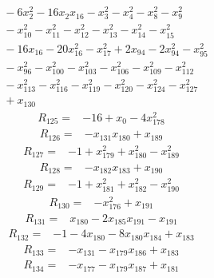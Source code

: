 {\begin{align*}
&{}  - 6x_{2}^{2} - 16x_{2} x_{16} - x_{3}^{2} - x_{4}^{2} - x_{8}^{2} - x_{9}^{2} \\
&{}  - x_{10}^{2} - x_{11}^{2} - x_{12}^{2} - x_{13}^{2} - x_{14}^{2} - x_{15}^{2} \\
&{}  - 16x_{16} - 20x_{16}^{2} - x_{17}^{2} + 2x_{94} - 2x_{94}^{2} - x_{95}^{2} \\
&{}  - x_{96}^{2} - x_{100}^{2} - x_{103}^{2} - x_{106}^{2} - x_{109}^{2} - x_{112}^{2} \\
&{}  - x_{113}^{2} - x_{116}^{2} - x_{119}^{2} - x_{120}^{2} - x_{124}^{2} - x_{127}^{2} \\
&{}  + x_{130}
\end{align*}
\begin{align*}
R_{125} ={}& -16 + x_{0} - 4x_{178}^{2}
\end{align*}
\begin{align*}
R_{126} ={}& -x_{131} x_{180} + x_{189}
\end{align*}
\begin{align*}
R_{127} ={}& -1 + x_{179}^{2} + x_{180}^{2} - x_{189}^{2}
\end{align*}
\begin{align*}
R_{128} ={}& -x_{182} x_{183} + x_{190}
\end{align*}
\begin{align*}
R_{129} ={}& -1 + x_{181}^{2} + x_{182}^{2} - x_{190}^{2}
\end{align*}
\begin{align*}
R_{130} ={}& -x_{176}^{2} + x_{191}
\end{align*}
\begin{align*}
R_{131} ={}& x_{180} - 2x_{185} x_{191} - x_{191}
\end{align*}
\begin{align*}
R_{132} ={}& -1 - 4x_{180} - 8x_{180} x_{184} + x_{183}
\end{align*}
\begin{align*}
R_{133} ={}& -x_{131} - x_{179} x_{186} + x_{183}
\end{align*}
\begin{align*}
R_{134} ={}& -x_{177} - x_{179} x_{187} + x_{181}

\end{align*}}
